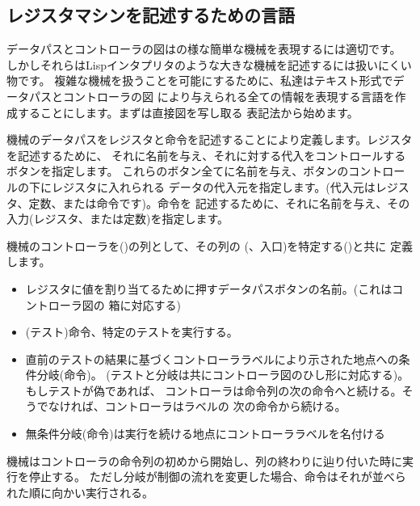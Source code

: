\subsection{レジスタマシンを記述するための言語}
\label{Section 5.1.1}


データパスとコントローラの図はの様な簡単な機械を表現するには適切です。
しかしそれらはLispインタプリタのような大きな機械を記述するには扱いにくい物です。
複雑な機械を扱うことを可能にするために、私達はテキスト形式でデータパスとコントローラの図
により与えられる全ての情報を表現する言語を作成することにします。まずは直接図を写し取る
表記法から始めます。

機械のデータパスをレジスタと命令を記述することにより定義します。レジスタを記述するために、
それに名前を与え、それに対する代入をコントロールするボタンを指定します。
これらのボタン全てに名前を与え、ボタンのコントロールの下にレジスタに入れられる
データの代入元を指定します。(代入元はレジスタ、定数、または命令です)。命令を
記述するために、それに名前を与え、その入力(レジスタ、または定数)を指定します。

機械のコントローラを()の列として、その列の
(、入口)を特定する()と共に
定義します。

\begin{itemize}

\item
レジスタに値を割り当てるために押すデータパスボタンの名前。(これはコントローラ図の
箱に対応する)

\item
{}(テスト)命令、特定のテストを実行する。

\item
直前のテストの結果に基づくコントローララベルにより示された地点への条件分岐(命令)。
(テストと分岐は共にコントローラ図のひし形に対応する)。もしテストが偽であれば、
コントローラは命令列の次の命令へと続ける。そうでなければ、コントローラはラベルの
次の命令から続ける。

\item
無条件分岐(命令)は実行を続ける地点にコントローララベルを名付ける

\end{itemize}

\noindent
機械はコントローラの命令列の初めから開始し、列の終わりに辿り付いた時に実行を停止する。
ただし分岐が制御の流れを変更した場合、命令はそれが並べられた順に向かい実行される。

